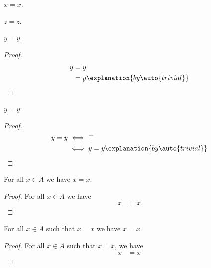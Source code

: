 \begin{proposition}\label{trivial}
    $x = x$.
\end{proposition}

\begin{proposition}\label{irrelevant}
    $z = z$.
\end{proposition}

\begin{proposition}\label{alsotrivial}
    $y = y$.
\end{proposition}
\begin{proof}
    \begin{align*}
        y
            &= y
                \\
            &= y
                \explanation{by \auto{trivial}}
    \end{align*}
\end{proof}

\begin{proposition}\label{trivial_biconditionals}
    $y = y$.
\end{proposition}
\begin{proof}
    \begin{align*}
        y = y
            &\iff \top
                \\
            &\iff y = y
                \explanation{by \auto{trivial}}
    \end{align*}
\end{proof}

\begin{proposition}\label{bounded_calc}
    For all $x \in A$ we have $x = x$.
\end{proposition}
\begin{proof}
    For all $x \in A$ we have
    \begin{align*}
        x
            &= x
    \end{align*}
\end{proof}

\begin{proposition}\label{bounded_calc_such_that}
    For all $x \in A$ such that $x = x$ we have $x = x$.
\end{proposition}
\begin{proof}
    For all $x \in A$ such that $x = x$, we have
    \begin{align*}
        x
            &= x
    \end{align*}
\end{proof}
